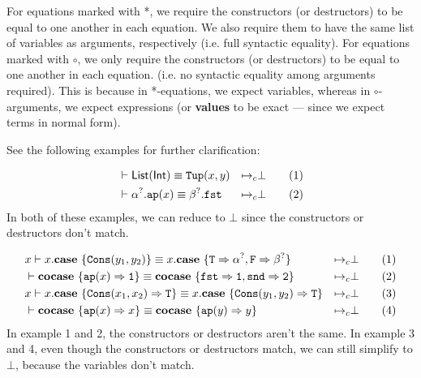 \documentclass[twoside,12pt,a4paper]{article}
\begin{document}
For equations marked with *, we require the constructors (or destructors) to be equal to one another in each equation. 
We also require them to have the same list of variables as arguments, respectively (i.e. full syntactic equality).
For equations marked with $\circ$, we only require the constructors (or destructors) to be equal to one another in each equation. 
(i.e. no syntactic equality among arguments required).
This is because in *-equations, we expect variables, whereas in $\circ$-arguments, we expect expressions (or \textbf{values} to be exact --- since we expect terms in normal form).

See the following examples for further clarification:
\begin{example}
    \begin{align}
        &\vdash \mathsf{List(Int)}\equiv \mathtt{Tup(}x, y\mathtt{)}
        &\mapsto_c& \bot \tag{1}\\
        &\vdash \alpha^?.\texttt{ap}(x) \equiv \beta^?.\mathtt{fst}
        &\mapsto_c& \bot \tag{2}
    \end{align}
    In both of these examples, we can reduce to $\bot$ since the constructors or destructors don't match.
\end{example}

\begin{example}
    \begin{align*}
        &x\vdash x.\textbf{case}\ \{\mathtt{Cons(}y_1, y_2\mathtt{)}\} 
        \equiv x.\textbf{case}\ \{\mathtt{T} \Rightarrow\alpha^?, \mathtt{F}\Rightarrow \beta^?\}
        &\mapsto_c& \bot \tag{1}\\
        &\vdash \textbf{cocase}\ \{\texttt{ap}(x)\Rightarrow \mathtt{1}\}
        \equiv \textbf{cocase}\ \{\mathtt{fst\Rightarrow 1, snd\Rightarrow 2}\}
        &\mapsto_c& \bot \tag{2}\\
        &x\vdash x.\textbf{case}\ \{\mathtt{Cons(}x_1, x_2\mathtt{)}\Rightarrow \mathtt{T}\} 
        \equiv x.\textbf{case}\ \{\mathtt{Cons(}y_1, y_2\mathtt{)}\Rightarrow\mathtt{T}\}
        &\mapsto_c& \bot \tag{3}\\
        &\vdash \textbf{cocase}\ \{\texttt{ap}(x)\Rightarrow x\}
        \equiv \textbf{cocase}\ \{\texttt{ap}(y)\Rightarrow y\}
        &\mapsto_c& \bot \tag{4}
    \end{align*}
    In example 1 and 2, the constructors or destructors aren't the same.
    In example 3 and 4, even though the constructors or destructors match, we can still simplify to $\bot$, because the variables don't match.
\end{example}
\end{document}
